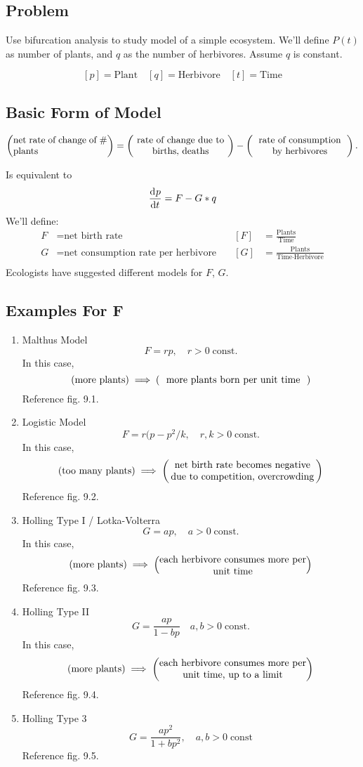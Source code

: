 \documentclass[12pt]{article}
\begin{document}
\subsection{Problem}
Use bifurcation analysis to study model of a simple ecosystem.
We'll define $P(t)$ as  number of plants, and $q$ as the number of herbivores.
Assume $q$ is constant.

$$[p]=\text{Plant}\quad[q]=\text{Herbivore}\quad[t]=\text{Time}$$

\subsection{Basic Form of Model}
\begin{equation}
  \left( \text{\parbox{10em}{net rate of change of \# plants}} \right) = \left( \text{\parbox{10em}{\centering rate of change due to births, deaths}} \right) - \left( \text{\parbox{10em}{\centering rate of consumption by herbivores}} \right).
\end{equation}

Is equivalent to $$\frac{\mathrm{d}^{} {p}}{\mathrm{d}{t}^{}}=F-G*q$$
We'll define:
\begin{equation}
  \begin{aligned}
    F &= \text{net birth rate} &\quad [F] &= \frac{\text{Plants}}{\text{Time}} \\
    G &=  \text{net consumption rate per herbivore} &\quad [G]&= \frac{\text{Plants}}{\text{Time} \cdot \text{Herbivore}} \\
  \end{aligned}
\end{equation}
Ecologists have suggested different models for $F$, $G$.

\subsection{Examples For F}
\begin{enumerate}
\item Malthus Model
$$F = rp, \quad r>0\;\text{const}.$$
In this case,
$$\left(\text{more plants}\right) \implies \left(\text{\parbox{15em}{\centering more plants
    born per unit time}}\right)$$
Reference fig. 9.1.
\item Logistic Model
$$F= r(p-p^2/k, \quad r,k>0\;\text{const}.$$
In this case,
$$\left(\text{too many plants}\right) \implies
\left(\text{\parbox{15em}{\centering net birth rate becomes negative due to
      competition, overcrowding}}\right)$$
Reference fig. 9.2.
\item Holling Type I / Lotka-Volterra
$$G = ap,\quad a>0\;\text{const}.$$
In this case,
$$\left(\text{more plants}\right) \implies \left(\text{\parbox{15em}{\centering
      each herbivore consumes more per unit time}}\right)$$
Reference fig. 9.3.
\item Holling Type II
$$G = \frac{ap}{1-bp}\quad a,b>0\;\text{const}.$$
In this case,
$$\left(\text{more plants}\right) \implies \left(\text{\parbox{15em}{\centering
      each herbivore consumes more per unit time, up to a limit}}\right)$$
Reference fig. 9.4.
\item Holling Type 3
$$G=\frac{ap^2}{1+bp^2},\quad a,b>0\;\text{const}$$
Reference fig. 9.5.
\end{enumerate}
\end{document}
